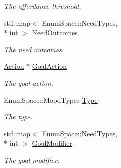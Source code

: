 \begin{DoxyCompactItemize}
\begin{DoxyCompactList}\small\item\em The affordance threshold. \end{DoxyCompactList}\item 
\hypertarget{classabstract_afb38289e3dfe396d24eed2529e0120dd}{std\-::map$<$ Enum\-Space\-::\-Need\-Types, \\*
int $>$ \hyperlink{classabstract_afb38289e3dfe396d24eed2529e0120dd}{Need\-Outcomes}}\label{classabstract_afb38289e3dfe396d24eed2529e0120dd}

\begin{DoxyCompactList}\small\item\em The need outcomes. \end{DoxyCompactList}\item 
\hypertarget{classabstract_aa5210c5b94421c34f5c1dc03aa5c2073}{\hyperlink{class_action}{Action} $\ast$ \hyperlink{classabstract_aa5210c5b94421c34f5c1dc03aa5c2073}{Goal\-Action}}\label{classabstract_aa5210c5b94421c34f5c1dc03aa5c2073}

\begin{DoxyCompactList}\small\item\em The goal action. \end{DoxyCompactList}\item 
\hypertarget{classabstract_a0d0baf0587f57cbc4b684fc4e85f81f9}{Enum\-Space\-::\-Mood\-Types \hyperlink{classabstract_a0d0baf0587f57cbc4b684fc4e85f81f9}{Type}}\label{classabstract_a0d0baf0587f57cbc4b684fc4e85f81f9}

\begin{DoxyCompactList}\small\item\em The type. \end{DoxyCompactList}\item 
\hypertarget{classabstract_a8f3b954f75474eb84bf8f1906530800f}{std\-::map$<$ Enum\-Space\-::\-Need\-Types, \\*
int $>$ \hyperlink{classabstract_a8f3b954f75474eb84bf8f1906530800f}{Goal\-Modifier}}\label{classabstract_a8f3b954f75474eb84bf8f1906530800f}

\begin{DoxyCompactList}\small\item\em The goal modifier. \end{DoxyCompactList}\end{DoxyCompactItemize}


